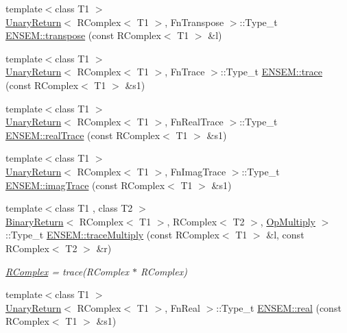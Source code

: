 \begin{DoxyCompactItemize}
\item 
{\footnotesize template$<$class T1 $>$ }\\\mbox{\hyperlink{structUnaryReturn}{Unary\+Return}}$<$ R\+Complex$<$ T1 $>$, Fn\+Transpose $>$\+::Type\+\_\+t \mbox{\hyperlink{group__rcomplex_gaadd686b6457e8156edd6c65c475e4eb5}{E\+N\+S\+E\+M\+::transpose}} (const R\+Complex$<$ T1 $>$ \&l)
\item 
{\footnotesize template$<$class T1 $>$ }\\\mbox{\hyperlink{structUnaryReturn}{Unary\+Return}}$<$ R\+Complex$<$ T1 $>$, Fn\+Trace $>$\+::Type\+\_\+t \mbox{\hyperlink{group__rcomplex_ga9f6f9e69dbfccacb954b9fd9947ca592}{E\+N\+S\+E\+M\+::trace}} (const R\+Complex$<$ T1 $>$ \&s1)
\item 
{\footnotesize template$<$class T1 $>$ }\\\mbox{\hyperlink{structUnaryReturn}{Unary\+Return}}$<$ R\+Complex$<$ T1 $>$, Fn\+Real\+Trace $>$\+::Type\+\_\+t \mbox{\hyperlink{group__rcomplex_ga27bda5008ac5b345ddf3273c5949d00c}{E\+N\+S\+E\+M\+::real\+Trace}} (const R\+Complex$<$ T1 $>$ \&s1)
\item 
{\footnotesize template$<$class T1 $>$ }\\\mbox{\hyperlink{structUnaryReturn}{Unary\+Return}}$<$ R\+Complex$<$ T1 $>$, Fn\+Imag\+Trace $>$\+::Type\+\_\+t \mbox{\hyperlink{group__rcomplex_ga57832278e9583a5d6e01e547dfdbb896}{E\+N\+S\+E\+M\+::imag\+Trace}} (const R\+Complex$<$ T1 $>$ \&s1)
\item 
{\footnotesize template$<$class T1 , class T2 $>$ }\\\mbox{\hyperlink{structBinaryReturn}{Binary\+Return}}$<$ R\+Complex$<$ T1 $>$, R\+Complex$<$ T2 $>$, \mbox{\hyperlink{structOpMultiply}{Op\+Multiply}} $>$\+::Type\+\_\+t \mbox{\hyperlink{group__rcomplex_gaf1ed70437ca66203b33532ddb96e2657}{E\+N\+S\+E\+M\+::trace\+Multiply}} (const R\+Complex$<$ T1 $>$ \&l, const R\+Complex$<$ T2 $>$ \&r)
\begin{DoxyCompactList}\small\item\em \mbox{\hyperlink{classENSEM_1_1RComplex}{R\+Complex}} = trace(\+R\+Complex $\ast$ R\+Complex) \end{DoxyCompactList}\item 
{\footnotesize template$<$class T1 $>$ }\\\mbox{\hyperlink{structUnaryReturn}{Unary\+Return}}$<$ R\+Complex$<$ T1 $>$, Fn\+Real $>$\+::Type\+\_\+t \mbox{\hyperlink{group__rcomplex_gac6f6a1d512bae897437df14ec96570a7}{E\+N\+S\+E\+M\+::real}} (const R\+Complex$<$ T1 $>$ \&s1)
\item 

\end{DoxyCompactItemize}
